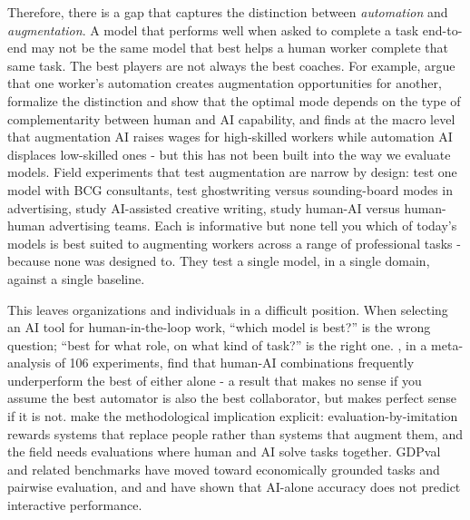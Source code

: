 Therefore, there is a gap that captures the distinction between \emph{automation} and \emph{augmentation}. A model that performs well when asked to complete a task end-to-end may not be the same model that best helps a human worker complete that same task. The best players are not always the best coaches. For example, \citet{agrawal2023} argue that one worker's automation creates augmentation opportunities for another, \citet{fugener2026} formalize the distinction and show that the optimal mode depends on the type of complementarity between human and AI capability, and \citet{marguerit2025} finds at the macro level that augmentation AI raises wages for high-skilled workers while automation AI displaces low-skilled ones - but this has not been built into the way we evaluate models. Field experiments that test augmentation are narrow by design: \citet{dellacqua2023} test one model with BCG consultants, \citet{chen2024} test ghostwriting versus sounding-board modes in advertising, \citet{doshi2024} study AI-assisted creative writing, \citet{ju2026} study human-AI versus human-human advertising teams. Each is informative but none tell you which of today's models is best suited to augmenting workers across a range of professional tasks - because none was designed to. They test a single model, in a single domain, against a single baseline.



This leaves organizations and individuals in a difficult position. When selecting an AI tool for human-in-the-loop work, ``which model is best?'' is the wrong question; ``best for what role, on what kind of task?'' is the right one. \citet{vaccaro2024}, in a meta-analysis of 106 experiments, find that human-AI combinations frequently underperform the best of either alone - a result that makes no sense if you assume the best automator is also the best collaborator, but makes perfect sense if it is not. \citet{haupt2025} make the methodological implication explicit: evaluation-by-imitation rewards systems that replace people rather than systems that augment them, and the field needs evaluations where human and AI solve tasks together. GDPval \citep{gdpval2025} and related benchmarks \citep{profbench2025, jobbench2026} have moved toward economically grounded tasks and pairwise evaluation, and \citet{collins2024} and \citet{chang2025} have shown that AI-alone accuracy does not predict interactive performance. 

